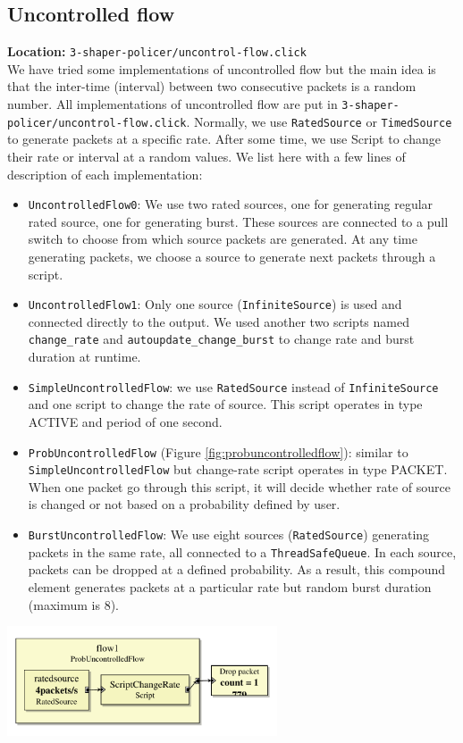 \documentclass[a4paper]{article}
\begin{document}
  \subsection{Uncontrolled flow}
  \textbf{Location:} \texttt{3-shaper-policer/uncontrol-flow.click} \\
  We have tried some implementations of uncontrolled flow but the main idea is that the inter-time (interval) between two consecutive packets is a random
  number. All implementations of uncontrolled flow are put in \texttt{3-shaper-policer/uncontrol-flow.click}. Normally, we use \texttt{RatedSource} or \texttt{TimedSource} to generate packets at a specific rate. After some time, we use Script to change their rate or interval at a random values. We list here with a few lines of description of each implementation:
  \begin{itemize}
  	\item \texttt{UncontrolledFlow0}: We use two rated sources, one for generating regular rated source, one for generating burst. These sources are connected to a pull switch to choose from which source packets are generated. At any time generating packets, we choose a source to generate next packets through a script. 
  	\item \texttt{UncontrolledFlow1}: Only one source (\texttt{InfiniteSource}) is used and connected directly to the output. We used another two scripts named \texttt{change\_rate} and \texttt{autoupdate\_change\_burst} to change rate and burst duration at runtime.
  	\item \texttt{SimpleUncontrolledFlow}: we use \texttt{RatedSource} instead of \texttt{InfiniteSource} and one script to change the rate of source. This script operates in type ACTIVE and period of one second.
  	\item \texttt{ProbUncontrolledFlow} (Figure \ref{fig:probuncontrolledflow}): similar to \texttt{SimpleUncontrolledFlow} but change-rate script operates in type PACKET. When one packet go through this script, it will decide whether rate of source is changed or not based on a probability defined by user.
  	\item \texttt{BurstUncontrolledFlow}: We use eight sources (\texttt{RatedSource}) generating packets in the same rate, all connected to a \texttt{ThreadSafeQueue}. In each source, packets can be dropped at a defined probability. As a result, this compound element generates packets at a particular rate but random burst duration (maximum is 8). 
  \end{itemize}
  \begin{center}
	\includegraphics[width=0.60\textwidth]{probuncontrolledflow.pdf}
	\label{fig:probuncontrolledflow}
  \end{center}
  
\end{document}
